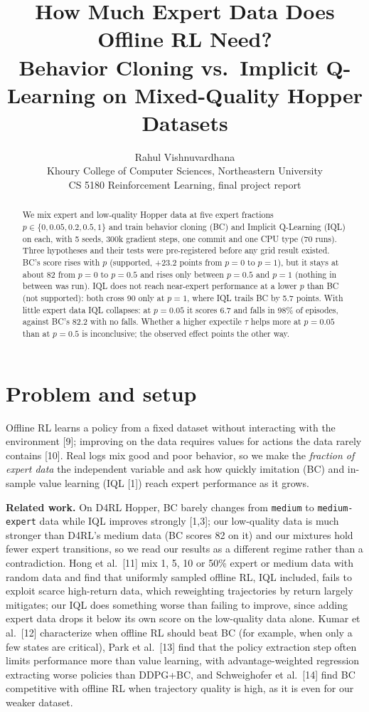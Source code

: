 \documentclass{article}
\title{How Much Expert Data Does Offline RL Need?\\
Behavior Cloning vs.\ Implicit Q-Learning on Mixed-Quality Hopper Datasets}
\author{Rahul Vishnuvardhana\\
Khoury College of Computer Sciences, Northeastern University\\
CS 5180 Reinforcement Learning, final project report}
\begin{document}
\maketitle

\begin{abstract}
We mix expert and low-quality Hopper data at five expert fractions $p\in\{0,0.05,0.2,0.5,1\}$ and train behavior cloning (BC) and Implicit Q-Learning (IQL) on each, with 5 seeds, 300k gradient steps, one commit and one CPU type (70 runs). Three hypotheses and their tests were pre-registered before any grid result existed. BC's score rises with $p$ (supported, +23.2 points from $p=0$ to $p=1$), but it stays at about 82 from $p=0$ to $p=0.5$ and rises only between $p=0.5$ and $p=1$ (nothing in between was run). IQL does not reach near-expert performance at a lower $p$ than BC (not supported): both cross 90 only at $p=1$, where IQL trails BC by 5.7 points. With little expert data IQL collapses: at $p=0.05$ it scores 6.7 and falls in 98\% of episodes, against BC's 82.2 with no falls. Whether a higher expectile $\tau$ helps more at $p=0.05$ than at $p=0.5$ is inconclusive; the observed effect points the other way.
\end{abstract}

\section{Problem and setup}
Offline RL learns a policy from a fixed dataset without interacting with the environment [9]; improving on the data requires values for actions the data rarely contains [10]. Real logs mix good and poor behavior, so we make the \emph{fraction of expert data} the independent variable and ask how quickly imitation (BC) and in-sample value learning (IQL [1]) reach expert performance as it grows.

\textbf{Related work.} On D4RL Hopper, BC barely changes from \texttt{medium} to \texttt{medium-expert} data while IQL improves strongly [1,3]; our low-quality data is much stronger than D4RL's medium data (BC scores 82 on it) and our mixtures hold fewer expert transitions, so we read our results as a different regime rather than a contradiction. Hong et al.\ [11] mix 1, 5, 10 or 50\% expert or medium data with random data and find that uniformly sampled offline RL, IQL included, fails to exploit scarce high-return data, which reweighting trajectories by return largely mitigates; our IQL does something worse than failing to improve, since adding expert data drops it below its own score on the low-quality data alone. Kumar et al.\ [12] characterize when offline RL should beat BC (for example, when only a few states are critical), Park et al.\ [13] find that the policy extraction step often limits performance more than value learning, with advantage-weighted regression extracting worse policies than DDPG+BC, and Schweighofer et al.\ [14] find BC competitive with offline RL when trajectory quality is high, as it is even for our weaker dataset.
\end{document}
